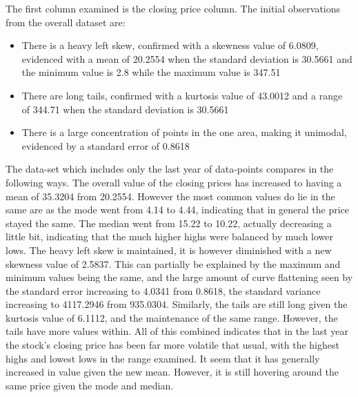 The first column examined is the closing price column. The initial observations from the overall dataset are:
\begin{itemize}
    \item There is a heavy left skew, confirmed with a skewness value of 6.0809, evidenced with a mean of 20.2554 when the standard deviation is 30.5661 and the minimum value is 2.8 while the maximum value is 347.51
    \item There are long tails, confirmed with a kurtosis value of 43.0012 and a range of 344.71 when the standard deviation is 30.5661
    \item There is a large concentration of points in the one area, making it unimodal, evidenced by a standard error of 0.8618
\end{itemize}
The data-set which includes only the last year of data-points compares in the following ways. The overall value of the closing prices has increased to having a mean of 35.3204 from 20.2554. However the most common values do lie in the same are as the mode went from 4.14 to 4.44, indicating that in general the price stayed the same. The median went from 15.22 to 10.22, actually decreasing a little bit, indicating that the much higher highs were balanced by much lower lows. The heavy left skew is maintained, it is however diminished with a new skewness value of 2.5837. This can partially be explained by the maximum and minimum values being the same, and the large amount of curve flattening seen by the standard error increasing to 4.0341 from 0.8618, the standard variance increasing to 4117.2946 from 935.0304. Similarly, the tails are still long given the kurtosis value of 6.1112, and the maintenance of the same range. However, the tails have more values within. All of this combined indicates that in the last year the stock's closing price has been far more volatile that usual, with the highest highs and lowest lows in the range examined. It seem that it has generally increased in value given the new mean. However, it is still hovering around the same price given the mode and median.

